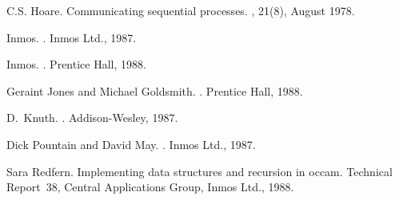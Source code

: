 \begin{thebibliography}{Knu87}

C.S. Hoare.
\newblock Communicating sequential processes.
, 21(8), August 1978.

Inmos.
.
\newblock Inmos Ltd., 1987.

Inmos.
.
\newblock Prentice Hall, 1988.

Geraint Jones and Michael Goldsmith.
.
\newblock Prentice Hall, 1988.

D.~Knuth.
.
\newblock Addison-Wesley, 1987.

Dick Pountain and David May.
.
\newblock Inmos Ltd., 1987.

Sara Redfern.
\newblock Implementing data structures and recursion in occam.
\newblock Technical Report~38, Central Applications Group, Inmos Ltd., 1988.

\end{thebibliography}
\setlength{\baselineskip}{2ex}
